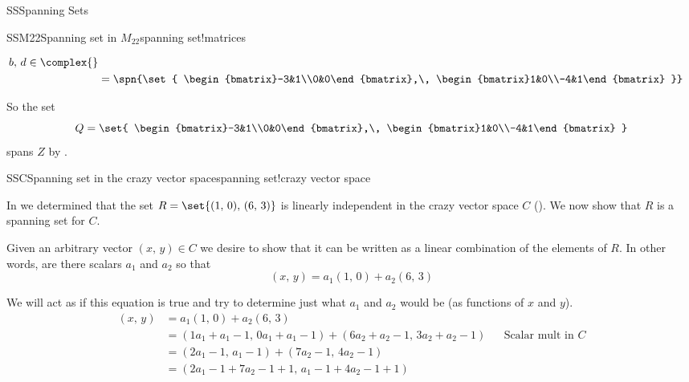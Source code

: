 \begin{subsect}{SS}{Spanning Sets}
\begin{example}{SSM22}{Spanning set in $M_{22}$}{spanning set!matrices}
\begin{para}
\begin{align*}
{}{b,\,d\in\complex{\null}}\\
%
&=\spn{\set{
\begin{bmatrix}-3&1\\0&0\end{bmatrix},\,
\begin{bmatrix}1&0\\-4&1\end{bmatrix}
}}
%
\end{align*}
\end{para}
%
\begin{para}So the set
%
\begin{equation*}
Q=\set{
\begin{bmatrix}-3&1\\0&0\end{bmatrix},\,
\begin{bmatrix}1&0\\-4&1\end{bmatrix}
}
\end{equation*}
%
spans $Z$ by .\end{para}
%
\end{example}
%
%
\begin{example}{SSC}{Spanning set in the crazy vector space}{spanning set!crazy vector space}
\begin{para}In  we determined that the set $R=\set{(1,\,0),\,(6,\,3)}$ is linearly independent in the crazy vector space $C$ ().  We now show that $R$ is a spanning set for $C$.\end{para}
%
\begin{para}Given an arbitrary vector $(x,\,y)\in C$ we desire to show that it can be written as a linear combination of the elements of $R$.  In other words, are there scalars $a_1$ and $a_2$ so that
%
\begin{equation*}
(x,\,y)=a_1(1,\,0) + a_2(6,\,3)
\end{equation*}
\end{para}
%
\begin{para}We will act as if this equation is true and try to determine just what $a_1$ and $a_2$ would be (as functions of $x$ and $y$).
%
\begin{align*}
(x,\,y)&=a_1(1,\,0) + a_2(6,\,3)\\
&= (1a_1+a_1-1,\,0a_1+a_1-1) + (6a_2+a_2-1,\,3a_2+a_2-1)
&&\text{Scalar mult in $C$}\\
%
&= (2a_1-1,\,a_1-1) + (7a_2-1,\,4a_2-1)\\
%
&= (2a_1-1+7a_2-1+1,\,a_1-1+4a_2-1+1)

\end{align*}
\end{para}
\end{example}
\end{subsect}
